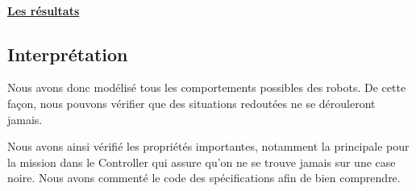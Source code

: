     \paragraph{\underline{Les résultats\\}}
    
    

  \subsection{Interprétation}
  
  Nous avons donc modélisé tous les comportements possibles des
  robots. De cette façon, nous pouvons vérifier que des situations
  redoutées ne se dérouleront jamais.

  Nous avons ainsi vérifié les propriétés importantes, notamment la
  principale pour la mission dans le Controller qui assure qu'on ne se
  trouve jamais sur une case noire. Nous avons commenté le code des
  spécifications afin de bien comprendre.
